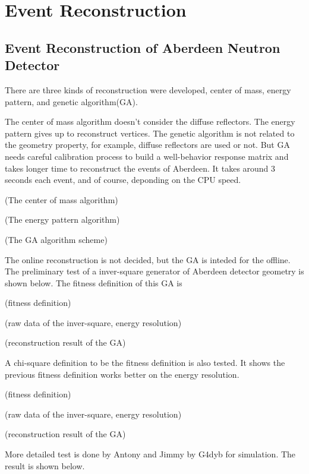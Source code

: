 \chapter {Event Reconstruction}
\section {Event Reconstruction of Aberdeen Neutron Detector}
There are three kinds of reconstruction were developed, center of mass,
energy pattern, and genetic algorithm(GA).

The center of mass algorithm doesn't consider the diffuse reflectors.
The energy pattern gives up to reconstruct vertices.
The genetic algorithm is not related to the geometry property, for example,
diffuse reflectors are used or not. But GA needs careful calibration process
to build a well-behavior response matrix and takes longer time to reconstruct
the events of Aberdeen. It takes around 3 seconds each event, and of course, deponding
on the CPU speed.


(The center of mass algorithm)




(The energy pattern algorithm)




(The GA algorithm scheme)


The online reconstruction is not decided, but the GA is inteded for
the offline. The preliminary test of a inver-square generator of Aberdeen
detector geometry is shown below. The fitness definition of this GA is


(fitness definition)




(raw data of the inver-square, energy resolution)




(reconstruction result of the GA)


A chi-square definition to be the fitness definition is also tested.
It shows the previous fitness definition works better on the
energy resolution.


(fitness definition)




(raw data of the inver-square, energy resolution)




(reconstruction result of the GA)


More detailed test is done by Antony and Jimmy by G4dyb for simulation.
The result is shown below.




